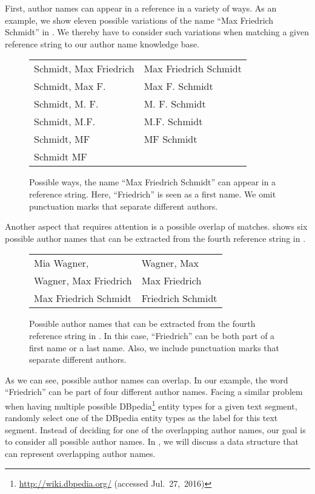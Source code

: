 First, author names can appear in a reference in a variety of ways.
As an example, we show eleven possible variations of the name ``Max Friedrich Schmidt'' in .
We thereby have to consider such variations when matching a given reference string to our author name knowledge base.
\begin{figure}[t]
\centering
\begin{tabular}{l l}
  \tabitem{}Schmidt, Max Friedrich&\tabitem{}Max Friedrich Schmidt\\
  \tabitem{}Schmidt, Max F.       &\tabitem{}Max F. Schmidt\\
  \tabitem{}Schmidt, M. F.        &\tabitem{}M. F. Schmidt\\
  \tabitem{}Schmidt, M.F.         &\tabitem{}M.F. Schmidt\\
  \tabitem{}Schmidt, MF           &\tabitem{}MF Schmidt\\
  \tabitem{}Schmidt MF            &{}
\end{tabular}
\caption{Possible ways, the name ``Max Friedrich Schmidt'' can appear in a reference string. Here, ``Friedrich'' is seen as a first name. We omit punctuation marks that separate different authors.}
\label{fig:example-name-variations}
\vspace{0.4cm}
\end{figure}

Another aspect that requires attention is a possible overlap of matches.
 shows six possible author names that can be extracted from the fourth reference string in .
\begin{figure}[t]
\centering
\begin{tabular}{l l}
  \tabitem{}Mia Wagner,          &\tabitem{}Wagner, Max\\
  \tabitem{}Wagner, Max Friedrich&\tabitem{}Max Friedrich\\
  \tabitem{}Max Friedrich Schmidt&\tabitem{}Friedrich Schmidt
\end{tabular}
\caption{Possible author names that can be extracted from the fourth reference string in . In this case, ``Friedrich'' can be both part of a first name or a last name. Also, we include punctuation marks that separate different authors.}
\label{fig:ref-4-example-author-names}
\end{figure}
As we can see, possible author names can overlap.
In our example, the word ``Friedrich'' can be part of four different author names.
Facing a similar problem when having multiple possible DBpedia\footnote{\url{http://wiki.dbpedia.org/} (accessed Jul.~27,~2016)} entity types for a given text segment, \citet{lu2013web} randomly select one of the DBpedia entity types as the label for this text segment.
Instead of deciding for one of the overlapping author names, our goal is to consider all possible author names.
In , we will discuss a data structure that can represent overlapping author names.

